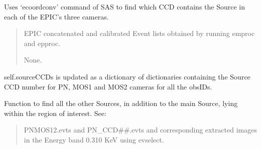 \documentclass[letterpaper,10pt,english]{sphinxmanual}
\begin{document}
\begin{fulllineitems}
\begin{fulllineitems}
\begin{quote}
\begin{description}
\end{description}\end{quote}

\end{fulllineitems}


\begin{fulllineitems}
\label{\detokenize{xmmPipeline:xmmPipeline.epicObj.epicObj.findSourceCCD}}
\pysigstartsignatures
{}
\pysigstopsignatures
\sphinxAtStartPar
Uses ‘ecoordconv’ command of SAS to find which CCD contains the Source
in each of the EPIC’s three cameras.
\begin{quote}\begin{description}
\sphinxAtStartPar
EPIC concatenated and calibrated Event lists obtained by running
emproc and epproc.

\sphinxAtStartPar
None.

\end{description}\end{quote}

\sphinxAtStartPar
self.sourceCCDs is updated as a dictionary of dictionaries containing the
Source CCD number for PN, MOS1 and MOS2 cameras for all the obsIDs.

\end{fulllineitems}


\begin{fulllineitems}
\label{\detokenize{xmmPipeline:xmmPipeline.epicObj.epicObj.find_otherSources}}
\pysigstartsignatures
{}
\pysigstopsignatures
\sphinxAtStartPar
Function to find all the other Sources, in addition to the main Source, lying within the region of interest.
See: 
\begin{quote}\begin{description}
\sphinxAtStartPar
PNMOS12.evts and PN\_CCD\#\#.evts and corresponding extracted images in the Energy band 0.3\sphinxhyphen{}10 KeV
using evselect.


\end{description}
\end{quote}
\end{fulllineitems}
\end{fulllineitems}
\end{document}

